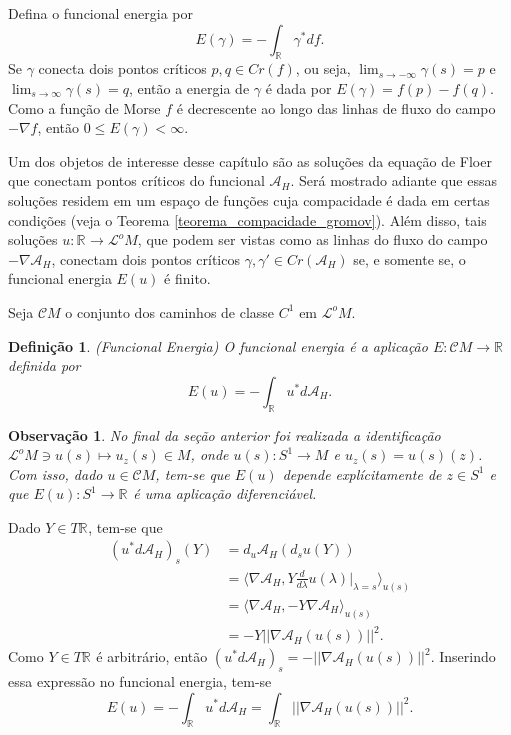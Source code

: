 \documentclass[12pt]{book}
\newtheorem{definicao}[teorema]{Definição}
\newtheorem{observacao}[teorema]{Observação}
\newcommand{\circulo}{S^{1}}
\newcommand{\derivada}[2]{\frac{d #1}{d #2}}
\newcommand{\funcionalH}{\mathcal{A}_{H}}
\newcommand{\gradiente}{\nabla f}
\newcommand{\gradientefuncional}{\nabla \funcionalH}
\newcommand{\norma}[1]{||#1||}
\newcommand{\pontoscriticos}[1]{\textit{Cr}(#1)}
\newcommand{\produtointerno}[2]{\langle #1, #2 \rangle}
\newcommand{\real}[1]{\mathbb{R}^{#1}}
\newcommand{\reta}{\real{}}
\newcommand{\lacocontrateis}{\mathcal{L}^{o}M}
\newcommand{\cilindrosLM}{\mathcal{C}M}
\begin{document}
	Defina o funcional energia por
	$$
	E(\gamma)= -\int_{\reta}\gamma^{*} df.
	$$
	Se $\gamma$ conecta dois pontos críticos $p,q\in \pontoscriticos{f}$, ou seja, $\lim_{s\to -\infty}\gamma(s)=p$ e $\lim_{s\to \infty}\gamma(s)=q$, então a energia de $\gamma$ é dada por $E(\gamma) = f(p) -f(q)$. Como a função de Morse $f$ é decrescente ao longo das linhas de fluxo do campo $-\gradiente$, então $0\leq E(\gamma)<\infty$.
	
	Um dos objetos de interesse desse capítulo são as soluções da equação de Floer que conectam pontos críticos do funcional $\funcionalH$. Será mostrado adiante que essas soluções residem em um espaço de funções cuja compacidade é dada em certas condições (veja o Teorema \ref{teorema_compacidade_gromov}). Além disso, tais soluções $u:\reta\to \lacocontrateis$, que podem ser vistas como as linhas do fluxo do campo $-\gradientefuncional$, conectam dois pontos críticos $\gamma, \gamma'\in \pontoscriticos{\funcionalH}$ se, e somente se, o funcional energia $E(u)$ é finito.
	
	Seja $\cilindrosLM$ o conjunto dos caminhos de classe $C^{1}$ em $\lacocontrateis$.
	
	\begin{definicao}
		(Funcional Energia) O funcional energia é a aplicação $E: \cilindrosLM \to \reta$ definida por
		$$
		E(u) = -\int_{\reta}u^{*}d\funcionalH.
		$$
	\end{definicao}
	
	\begin{observacao}
		No final da seção anterior foi realizada a identificação $\lacocontrateis \ni u(s) \mapsto u_{z}(s)\in M $, onde $u(s):\circulo\to M$ e $u_{z}(s) = u(s)(z)$.
		Com isso, dado $u \in \cilindrosLM$, tem-se que $E(u)$ depende explícitamente de $z \in \circulo$ e que $E(u):\circulo\to \reta$ é uma aplicação diferenciável.
	\end{observacao}
	
	Dado $Y \in T\reta$, tem-se que
	$$
	\begin{aligned}
	(u^{*}d\funcionalH)_{s}(Y) &= d_{u}\funcionalH(d_{s}u(Y))
	\\
	&=\produtointerno{\gradientefuncional}{Y\derivada{}{\lambda}u(\lambda)|_{\lambda=s}}_{u(s)}
	\\
	&=\produtointerno{\gradientefuncional}{-Y\gradientefuncional}_{u(s)}
	\\
	&=-Y\norma{\gradientefuncional(u(s))}^{2}.
	\end{aligned}
	$$
	Como $Y\in T\reta$ é arbitrário, então $(u^{*}d\funcionalH)_{s} = -\norma{\gradientefuncional(u(s))}^{2}$. Inserindo essa expressão no funcional energia, tem-se
	$$
	E(u)=-\int_{\reta}u^{*}d\funcionalH = \int_{\reta}\norma{\gradientefuncional(u(s))}^{2}.
	$$
	
\end{document}

